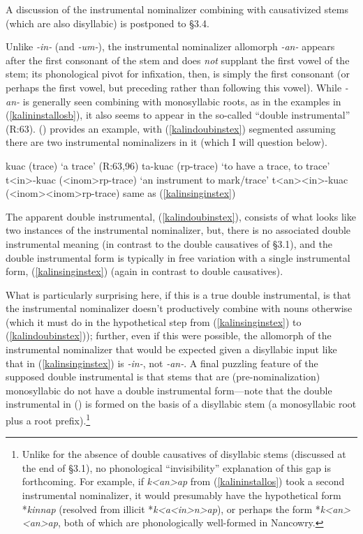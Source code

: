 \documentclass[output=paper,colorlinks,citecolor=brown,
]{langscibook}
\newcounter{nexttmp}    %
\newcounter{lasttmp}    %
\newcommand{\Next}{\setcounter{nexttmp}{\value{equation}}\stepcounter{nexttmp}(\thenexttmp)\xspace}
\newcommand{\Last}{\setcounter{lasttmp}{\value{equation}}(\thelasttmp)\xspace}
\begin{document}
\noindent A discussion of the instrumental nominalizer combining with causativized stems (which are also disyllabic) is postponed to \S3.4.

Unlike \textit{-in-} (and \textit{-um-}), the instrumental nominalizer allomorph \textit{-an-} appears after the first consonant of the stem and does \textit{not} supplant the first vowel of the stem; its phonological pivot for infixation, then, is simply the first consonant (or perhaps the first vowel, but preceding rather than following this vowel). While \textit{-an-} is generally seen combining with monosyllabic roots, as in the examples in (\ref{kalininstallosb}), it also seems to appear in the so-called ``double instrumental'' (R:63). \Next provides an example, with (\ref{kalindoubinstex}) segmented assuming there are two instrumental nominalizers in it (which I will question below).%

\ea\label{kalindoubinst} 
\ea kuac (trace) \hfill `a trace' (R:63,96)
\ex ta-kuac ({\sc rp-}trace) \hfill `to have a trace, to trace'
\ex t<in>-kuac ({\sc <inom>rp-}trace)  \hfill `an instrument to mark/trace' \label{kalinsinginstex}
\ex t<an><in>-kuac ({\sc <inom><inom>rp-}trace)  \hfill same as (\ref{kalinsinginstex}) \label{kalindoubinstex}
\z
\z

\noindent The apparent double instrumental, (\ref{kalindoubinstex}), consists of what looks like two instances of the instrumental nominalizer, but, there is no associated double instrumental meaning (in contrast to the double causatives of \S3.1), and the double instrumental form is typically in free variation with a single instrumental form, (\ref{kalinsinginstex}) (again in contrast to double causatives).

What is particularly surprising here, if this is a true double instrumental, is that the instrumental nominalizer doesn't productively combine with nouns otherwise (which it must do in the hypothetical step from (\ref{kalinsinginstex}) to (\ref{kalindoubinstex})); further, even if this were possible, the allomorph of the instrumental nominalizer that would be expected given a disyllabic input like that in (\ref{kalinsinginstex}) is \textit{-in-}, not \textit{-an-}. A final puzzling feature of the supposed double instrumental is that stems that are (pre-nominalization) monosyllabic do not have a double instrumental form---note that the double instrumental in \Last is formed on the basis of a disyllabic stem (a monosyllabic root plus a root prefix).\footnote{Unlike for the absence of double causatives of disyllabic stems (discussed at the end of \S3.1), no phonological ``invisibility'' explanation of this gap is forthcoming. For example, if \textit{k<an>ap} from (\ref{kalininstallos}) took a second instrumental nominalizer, it would presumably have the hypothetical form *\textit{kinnap} (resolved from illicit *\textit{k<a<in>n>ap}), or perhaps the form *\textit{k<an><an>ap}, both of which are  phonologically well-formed in Nancowry.}
\end{document}
